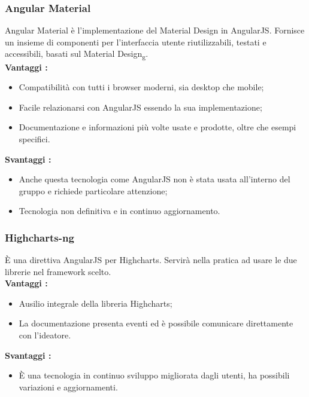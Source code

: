 {{		\subsubsection{Angular Material}{
			Angular Material è l’implementazione del Material Design in AngularJS. Fornisce un insieme di componenti per l’interfaccia utente riutilizzabili, testati e accessibili, basati sul Material Design\textsubscript{g}. \\
			\textbf{Vantaggi :}
			\begin{itemize}\itemsep1pt
				\item Compatibilità con tutti i browser moderni, sia desktop che mobile;
				\item Facile relazionarsi con AngularJS essendo la sua implementazione;
				\item Documentazione e informazioni più volte usate e prodotte, oltre che esempi specifici.
			\end{itemize}
			\textbf{Svantaggi :}
			\begin{itemize}\itemsep1pt
				\item Anche questa tecnologia come AngularJS non è stata usata all'interno del gruppo e richiede particolare attenzione;
				\item Tecnologia non definitiva e in continuo aggiornamento.
			\end{itemize}
		}
		\subsubsection{Highcharts-ng}{
			È una direttiva AngularJS per Highcharts. Servirà nella pratica ad usare le due librerie nel framework scelto.\\
			\textbf{Vantaggi :}
			\begin{itemize}\itemsep1pt
				\item Ausilio integrale della libreria Highcharts;
				\item La documentazione presenta eventi ed è possibile comunicare direttamente con l'ideatore.
			\end{itemize}
			\textbf{Svantaggi :}
			\begin{itemize}\itemsep1pt
				\item È una tecnologia in continuo sviluppo migliorata dagli utenti, ha possibili variazioni e aggiornamenti.
			\end{itemize}
		}
	}
}
